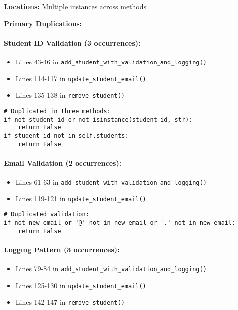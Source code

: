 \documentclass[11pt,a4paper]{article}
\begin{document}
\textbf{Locations:} Multiple instances across methods

\textbf{Primary Duplications:}

\paragraph{Student ID Validation (3 occurrences):}
\begin{itemize}[noitemsep]
    \item Lines 43-46 in \texttt{add\_student\_with\_validation\_and\_logging()}
    \item Lines 114-117 in \texttt{update\_student\_email()}
    \item Lines 135-138 in \texttt{remove\_student()}
\end{itemize}

\begin{lstlisting}[caption={Duplicated Validation Code}]
# Duplicated in three methods:
if not student_id or not isinstance(student_id, str):
    return False
if student_id not in self.students:
    return False
\end{lstlisting}

\paragraph{Email Validation (2 occurrences):}
\begin{itemize}[noitemsep]
    \item Lines 61-63 in \texttt{add\_student\_with\_validation\_and\_logging()}
    \item Lines 119-121 in \texttt{update\_student\_email()}
\end{itemize}

\begin{lstlisting}[caption={Duplicated Email Validation}]
# Duplicated validation:
if not new_email or '@' not in new_email or '.' not in new_email:
    return False
\end{lstlisting}

\paragraph{Logging Pattern (3 occurrences):}
\begin{itemize}[noitemsep]
    \item Lines 79-84 in \texttt{add\_student\_with\_validation\_and\_logging()}
    \item Lines 125-130 in \texttt{update\_student\_email()}
    \item Lines 142-147 in \texttt{remove\_student()}
\end{itemize}
\end{document}

